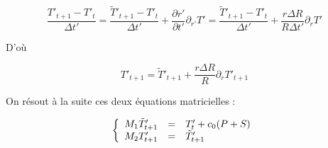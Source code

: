 \documentclass[10pt,a4paper]{article}
\numberwithin{equation}{section}
\begin{document}
\begin{equation}
\frac{T'_{t+1} - T'_{t}}{\Delta t'} = \frac{\tilde{T}'_{t+1} - T'_{t}}{\Delta t'} + \frac{\partial r'}{\partial t'} \partial_{r'} T' =  \frac{\tilde{T}'_{t+1} - T'_{t}}{\Delta t'} + \frac{r\Delta R}{R\Delta t'}\partial_{r} T'
\end{equation}

D'où

\begin{equation}
T'_{t+1}  = \tilde{T}'_{t+1} + \frac{r\Delta R}{R}\partial_{r} T'_{t+1}
\end{equation}

On résout à la suite ces deux équations matricielles :

\begin{equation}
\left\{
\begin{array}{r c l}
M_1 \tilde{T}'_{t+1} &=& T'_t + c_0 ( P + S )\\
M_2 T'_{t+1}   &=& \tilde{T}'_{t+1}\\
\end{array}
\right.
\end{equation}

\newpage

 
\end{document}

